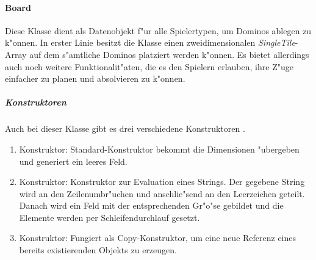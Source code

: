 \paragraph{Board}
\label{par:board}
Diese Klasse dient als Datenobjekt f"ur alle Spielertypen, um Dominos ablegen zu k"onnen. In erster Linie besitzt die Klasse einen zweidimensionalen \emph{SingleTile}-Array auf dem s"amtliche Dominos platziert werden k"onnen. Es bietet allerdings auch noch weitere Funktionalit"aten, die es den Spielern erlauben, ihre Z"uge einfacher zu planen und absolvieren zu k"onnen. 

\subparagraph{Konstruktoren}
Auch bei dieser Klasse gibt es drei verschiedene Konstruktoren . 
\begin{enumerate}
	\item Konstruktor: Standard-Konstruktor bekommt die Dimensionen "ubergeben und generiert ein leeres Feld. 
	\item Konstruktor: Konstruktor zur Evaluation eines Strings. Der gegebene String wird an den Zeilenumbr"uchen und anschlie"send an den Leerzeichen geteilt. Danach wird ein Feld mit der entsprechenden Gr"o"se gebildet und die Elemente werden per Schleifendurchlauf gesetzt. 
	\item Konstruktor: Fungiert als Copy-Konstruktor, um eine neue Referenz eines bereits existierenden Objekts zu erzeugen. 
\end{enumerate}

